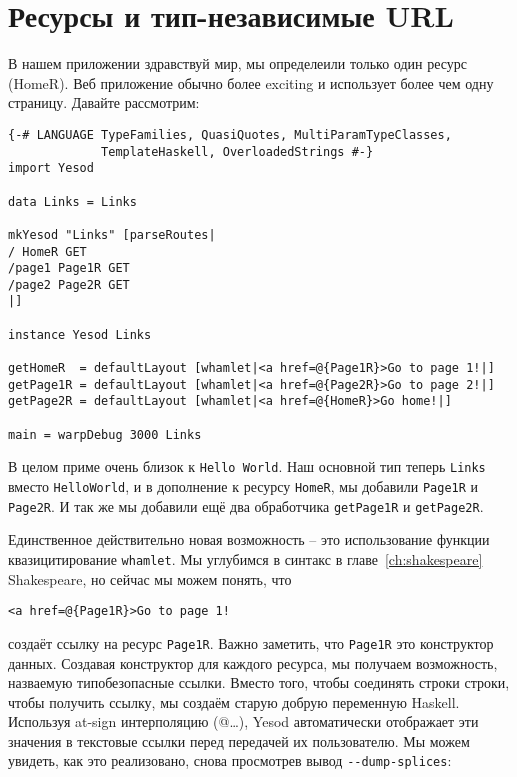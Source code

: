 \section{Ресурсы и тип-независимые URL}

В нашем приложении здравствуй мир, мы определеили только один ресурс (HomeR).
Веб приложение обычно более exciting и использует более чем одну страницу. Давайте рассмотрим:

\begin{lstlisting}
{-# LANGUAGE TypeFamilies, QuasiQuotes, MultiParamTypeClasses,
             TemplateHaskell, OverloadedStrings #-}
import Yesod

data Links = Links

mkYesod "Links" [parseRoutes|
/ HomeR GET
/page1 Page1R GET
/page2 Page2R GET
|]

instance Yesod Links

getHomeR  = defaultLayout [whamlet|<a href=@{Page1R}>Go to page 1!|]
getPage1R = defaultLayout [whamlet|<a href=@{Page2R}>Go to page 2!|]
getPage2R = defaultLayout [whamlet|<a href=@{HomeR}>Go home!|]

main = warpDebug 3000 Links
\end{lstlisting}

В целом приме очень близок к \lstinline'Hello World'. Наш основной тип теперь 
\lstinline'Links' вместо \lstinline'HelloWorld', и в дополнение к ресурсу \lstinline'HomeR', мы 
добавили \lstinline'Page1R' и \lstinline'Page2R'. И так же мы добавили ещё 
два обработчика \lstinline'getPage1R' и \lstinline'getPage2R'.

Единственное действительно новая возможность -- это использование функции 
квазицитирование \lstinline'whamlet'. Мы углубимся в синтакс в главе~\ref{ch:shakespeare} Shakespeare, 
но сейчас мы можем понять, что

\begin{lstlisting}
<a href=@{Page1R}>Go to page 1!
\end{lstlisting}

создаёт ссылку на ресурс \lstinline'Page1R'. Важно заметить, что \lstinline'Page1R' это конструктор 
данных. Создавая конструктор для каждого ресурса, мы получаем возможность, назваемую типобезопасные ссылки.
Вместо того, чтобы соединять строки строки, чтобы получить ссылку, мы создаём старую добрую 
переменную Haskell.
Используя at-sign интерполяцию (@{\ldots}), Yesod автоматически отображает
эти значения в текстовые ссылки перед передачей их пользователю. Мы можем увидеть, как это
реализовано, снова просмотрев вывод \lstinline'--dump-splices':

